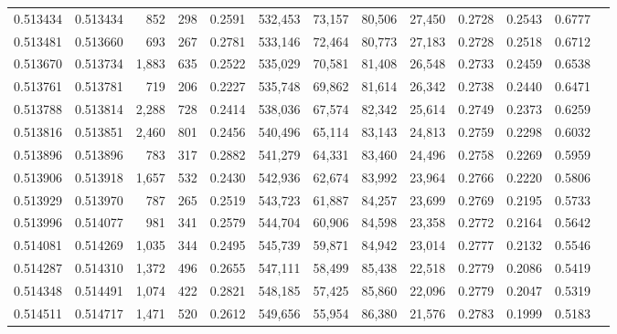 \begin{tabular}{rrrrrrrrrrrrr}
0.513434 & 0.513434 &    852 &   298 &                                     0.2591 & 532,453 &  73,157 &  80,506 &  27,450 & 0.2728 & 0.2543 & 0.6777 \\
0.513481 & 0.513660 &    693 &   267 &                                     0.2781 & 533,146 &  72,464 &  80,773 &  27,183 & 0.2728 & 0.2518 & 0.6712 \\
0.513670 & 0.513734 &  1,883 &   635 &                                     0.2522 & 535,029 &  70,581 &  81,408 &  26,548 & 0.2733 & 0.2459 & 0.6538 \\
0.513761 & 0.513781 &    719 &   206 &                                     0.2227 & 535,748 &  69,862 &  81,614 &  26,342 & 0.2738 & 0.2440 & 0.6471 \\
0.513788 & 0.513814 &  2,288 &   728 &                                     0.2414 & 538,036 &  67,574 &  82,342 &  25,614 & 0.2749 & 0.2373 & 0.6259 \\
0.513816 & 0.513851 &  2,460 &   801 &                                     0.2456 & 540,496 &  65,114 &  83,143 &  24,813 & 0.2759 & 0.2298 & 0.6032 \\
0.513896 & 0.513896 &    783 &   317 &                                     0.2882 & 541,279 &  64,331 &  83,460 &  24,496 & 0.2758 & 0.2269 & 0.5959 \\
0.513906 & 0.513918 &  1,657 &   532 &                                     0.2430 & 542,936 &  62,674 &  83,992 &  23,964 & 0.2766 & 0.2220 & 0.5806 \\
0.513929 & 0.513970 &    787 &   265 &                                     0.2519 & 543,723 &  61,887 &  84,257 &  23,699 & 0.2769 & 0.2195 & 0.5733 \\
0.513996 & 0.514077 &    981 &   341 &                                     0.2579 & 544,704 &  60,906 &  84,598 &  23,358 & 0.2772 & 0.2164 & 0.5642 \\
0.514081 & 0.514269 &  1,035 &   344 &                                     0.2495 & 545,739 &  59,871 &  84,942 &  23,014 & 0.2777 & 0.2132 & 0.5546 \\
0.514287 & 0.514310 &  1,372 &   496 &                                     0.2655 & 547,111 &  58,499 &  85,438 &  22,518 & 0.2779 & 0.2086 & 0.5419 \\
0.514348 & 0.514491 &  1,074 &   422 &                                     0.2821 & 548,185 &  57,425 &  85,860 &  22,096 & 0.2779 & 0.2047 & 0.5319 \\
0.514511 & 0.514717 &  1,471 &   520 &                                     0.2612 & 549,656 &  55,954 &  86,380 &  21,576 & 0.2783 & 0.1999 & 0.5183 \\

\end{tabular}
